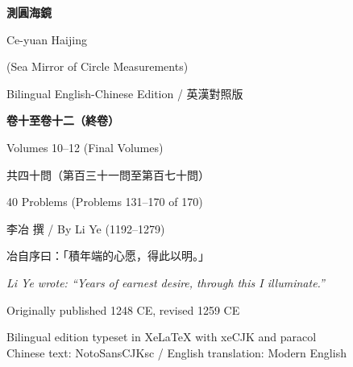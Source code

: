 \documentclass[11pt,a4paper]{article}
\begin{document}
\begin{titlepage}
\begin{center}
\vspace*{1.5cm}

{\fontsize{30}{36}\selectfont\bfseries\color{titlecolor} 測圓海鏡}

\vspace{0.4cm}
{\Large\color{sectioncolor} Ce-yuan Haijing}

\vspace{0.3cm}
{\normalsize\color{sectioncolor} (Sea Mirror of Circle Measurements)}

\vspace{0.8cm}
{\large\color{notecolor} Bilingual English-Chinese Edition / 英漢對照版}

\vspace{2cm}
{\fontsize{22}{28}\selectfont\bfseries 卷十至卷十二（終卷）}

\vspace{0.4cm}
{\large Volumes 10--12 (Final Volumes)}

\vspace{0.3cm}
{\normalsize\color{notecolor} 共四十問（第百三十一問至第百七十問）}

\vspace{0.2cm}
{\small 40 Problems (Problems 131--170 of 170)}

\vspace{2.5cm}
{\large 李冶 撰 / By Li Ye (1192--1279)}

\vspace{0.4cm}
{\small\color{notecolor} 冶自序曰：「積年端的心愿，得此以明。」}

\vspace{0.3cm}
{\small\textit{Li Ye wrote: ``Years of earnest desire, through this I illuminate.''}}

\vspace{2cm}
{\small Originally published 1248 CE, revised 1259 CE}

\vspace{0.8cm}
{\small\color{notecolor}
Bilingual edition typeset in XeLaTeX with xeCJK and paracol\\
Chinese text: NotoSansCJKsc / English translation: Modern English}

\end{center}
\end{titlepage}
\end{document}
